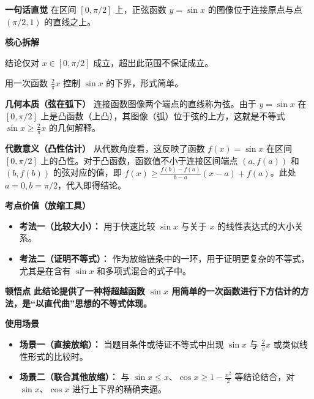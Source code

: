 \begin{explanationbox}
\textbf{\textcolor{CExplanation}{一句话直觉}}
在区间 $[0,\pi/2]$ 上，正弦函数 $y=\sin x$ 的图像位于连接原点与点 $(\pi/2, 1)$ 的直线之上。

\medskip
\textbf{\textcolor{CExplanation}{核心拆解}}
\begin{description}[style=nextline, leftmargin=2.8em, labelsep=0.5em, itemsep=0.45em]
    \item[\textbf{要点一（区间限制）：}] 结论仅对 $x \in [0,\pi/2]$ 成立，超出此范围不保证成立。
    \item[\textbf{要点二（线性控制）：}] 用一次函数 $\frac{2}{\pi}x$ 控制 $\sin x$ 的下界，形式简单。
\end{description}

\medskip
\textbf{\textcolor{CExplanation}{几何本质（弦在弧下）}}
连接函数图像两个端点的直线称为弦。由于 $y=\sin x$ 在 $[0,\pi/2]$ 上是凸函数（上凸），其图像（弧）位于弦的上方，这就是不等式 $\sin x \geq \frac{2}{\pi}x$ 的几何解释。

\medskip
\textbf{\textcolor{CExplanation}{代数意义（凸性估计）}}
从代数角度看，这反映了函数 $f(x)=\sin x$ 在区间 $[0,\pi/2]$ 上的凸性。对于凸函数，函数值不小于连接区间端点 $(a, f(a))$ 和 $(b, f(b))$ 的弦对应的值，即 $f(x) \geq \frac{f(b)-f(a)}{b-a}(x-a)+f(a)$。此处 $a=0, b=\pi/2$，代入即得结论。

\medskip
\textbf{\textcolor{CExplanation}{考点价值（放缩工具）}}
\begin{itemize}[leftmargin=*, itemsep=0.5em, topsep=0.4em]
    \item \textbf{考法一（比较大小）：} 用于快速比较 $\sin x$ 与关于 $x$ 的线性表达式的大小关系。
    \item \textbf{考法二（证明不等式）：} 作为放缩链条中的一环，用于证明更复杂的不等式，尤其是在含有 $\sin x$ 和多项式混合的式子中。
\end{itemize}

\medskip
\textbf{\textcolor{CExplanation}{顿悟点}}
\textbf{此结论提供了一种将超越函数 $\sin x$ 用简单的一次函数进行下方估计的方法，是“以直代曲”思想的不等式体现。}

\medskip
\textbf{\textcolor{CExplanation}{使用场景}}
\begin{itemize}[leftmargin=*, itemsep=0.5em, topsep=0.4em]
    \item \textbf{场景一（直接放缩）：} 当题目条件或待证不等式中出现 $\sin x$ 与 $\frac{2}{\pi}x$ 或类似线性形式的比较时。
    \item \textbf{场景二（联合其他放缩）：} 与 $\sin x \leq x$、$\cos x \geq 1-\frac{x^2}{2}$ 等结论结合，对 $\sin x$、$\cos x$ 进行上下界的精确夹逼。
\end{itemize}
\end{explanationbox}
